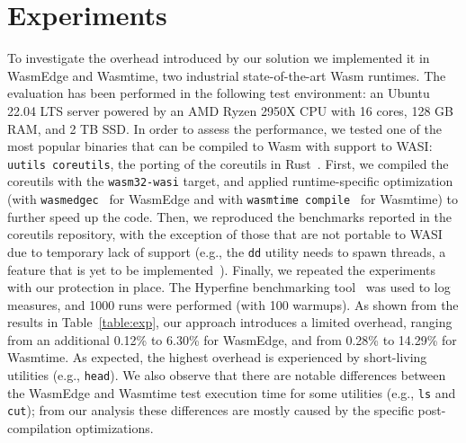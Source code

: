 \section{Experiments \label{sec:exp}}

To investigate the overhead introduced by our solution we implemented
it in WasmEdge and Wasmtime, two industrial state-of-the-art Wasm
runtimes. The evaluation has been performed in the following test
environment: an Ubuntu 22.04 LTS server powered by an AMD Ryzen 2950X
CPU with 16 cores, 128 GB RAM, and 2 TB SSD. %
In order to assess the performance, we tested one of the most popular
binaries that can be compiled to Wasm with support to WASI: {\tt uutils
coreutils}, the porting of the coreutils in Rust~\cite{coreutils-repo}.
First, we compiled the coreutils with the {\tt wasm32-wasi}
target, and applied runtime-specific optimization
(with {\tt wasmedgec}~\cite{wasmedgec} for WasmEdge and with
{\tt wasmtime compile}~\cite{wasmtimecompile} for Wasmtime) to further
speed up the code. Then, we reproduced
the benchmarks reported in the coreutils repository, with the
exception of those that are not portable to WASI due to temporary lack
of support (e.g., the {\tt dd} utility needs to spawn threads, a
feature that is yet to be implemented~\cite{wasi-threads}). Finally, we
repeated the experiments with our protection in place. The Hyperfine
benchmarking tool~\cite{hyperfine} was used to log measures, and 1000
runs were performed (with 100 warmups). As shown from the results in Table~\ref{table:exp}, our approach introduces
a limited overhead, ranging from an additional 0.12\% to 6.30\% for
WasmEdge, and from 0.28\% to 14.29\% for Wasmtime. As expected, the
highest overhead is experienced by short-living utilities (e.g.,
{\tt head}). We also observe that there are notable differences
between the WasmEdge and Wasmtime test execution time for some utilities (e.g.,
{\tt ls} and {\tt cut}); from our analysis these differences are
mostly caused by the specific post-compilation optimizations.

